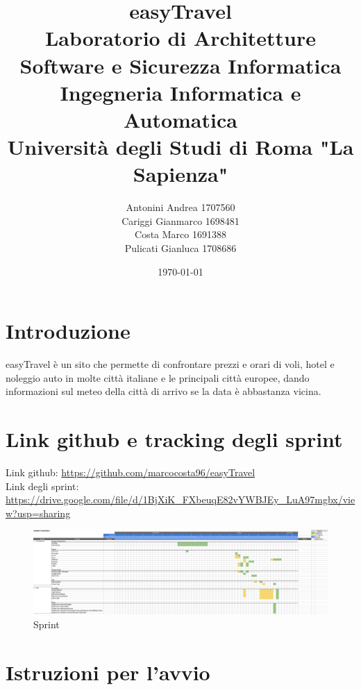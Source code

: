 \documentclass[11pt]{article}
\title{\textbf{easyTravel} \\ \bigskip \large Laboratorio di Architetture Software e Sicurezza Informatica \\ Ingegneria Informatica e Automatica \\ Università degli Studi di Roma "La Sapienza"}
\author{Antonini Andrea 1707560\\Cariggi Gianmarco 1698481\\Costa Marco 1691388\\Pulicati Gianluca 1708686}
\date{\today}
\begin{document}
\maketitle

\pagebreak

\tableofcontents

\pagebreak

\section{Introduzione}

easyTravel è un sito che permette di confrontare prezzi e orari di voli, hotel e noleggio auto in molte
città italiane e le principali città europee, dando informazioni sul meteo della città di arrivo se la data è abbastanza vicina.


\section{Link github e tracking degli sprint}

Link github: \href{https://github.com/marcocosta96/easyTravel}{https://github.com/marcocosta96/easyTravel} \\
Link degli sprint: \href{https://drive.google.com/file/d/1BjXiK_FXbeuqE82vYWBJEy_LuA97mgbx/view?usp=sharing}{https://drive.google.com/file/d/1BjXiK\newline\_FXbeuqE82vYWBJEy\_LuA97mgbx/view?usp=sharing}
\begin{figure}[!ht]
	\includegraphics[width=1\textwidth]{./sprint} %
	\caption{Sprint}
	\label{fig:sprint}
\end{figure}


\section{Istruzioni per l'avvio}
\end{document}
